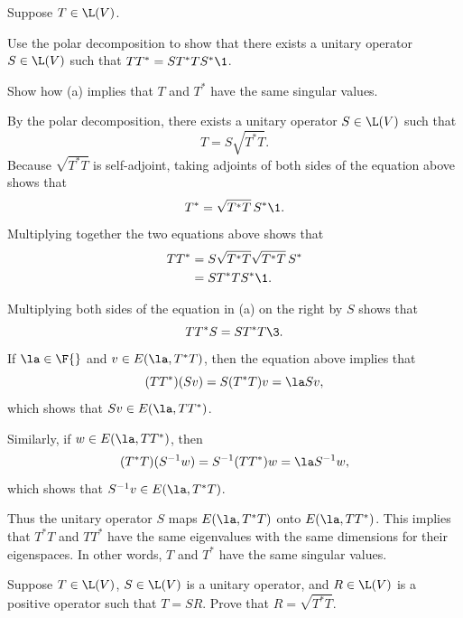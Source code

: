 \exercise
Suppose $T \in \L(V)$.
\begin{subtheorem}
\item
Use the polar decomposition to show that there exists a unitary operator $S \in \L(V)$ such that
$TT^* = ST^*TS^*\1$.
\item
Show how (a) implies that $T$ and $T^*$ have the same singular values.
\end{subtheorem}
\exercisesubtheoremend

\begin{Solution}
\begin{subtheorem}
\item
By the polar decomposition, there exists a unitary operator $S \in \L(V)$ such that
\[
T = S \sqrt{T^*T}.
\]
Because $\sqrt{T^*T}$ is self-adjoint, taking adjoints of both sides of the equation above shows that
\[
T^* = \sqrt{T^*T} \,S^*\1.
\]
Multiplying together the two equations above shows that
\begin{align*}
TT^* &= S \sqrt{T^*T} \sqrt{T^*T} \, S^* \\
&= S T^* T S^*\1.
\end{align*}

\item
Multiplying both sides of the equation in (a) on the right by $S$ shows that
\[
TT^* S = ST^*T\3.
\]
If $\la \in \F{}$ and $v \in E(\la, T^*T)$, then the equation above implies that
\[
(TT^*)(Sv) = S(T^*T)v = \la Sv,
\]
which shows that $Sv \in E(\la,TT^*)$.

Similarly, if $w \in E(\la, TT^*)$, then
\[
(T^*T)(S^{-1}w) = S^{-1} (TT^*)w = \la S^{-1}w,
\]
which shows that $S^{-1}v \in E(\la,T^*T)$.

Thus the unitary operator $S$ maps $E(\la, T^*T)$ onto $E(\la, TT^*)$. This implies that $T^*T$ and $TT^*$ have the same eigenvalues with the same dimensions for their eigenspaces. In other words, $T$ and $T^*$ have the same singular values.
\end{subtheorem}
\end{Solution}

\exercise
Suppose $T \in \L(V)$, $S \in \L(V)$ is a unitary operator,
and $R \in \L(V)$ is a  positive operator such that $T = SR$.  Prove that
$R = \sqrt{T^* T}$.

